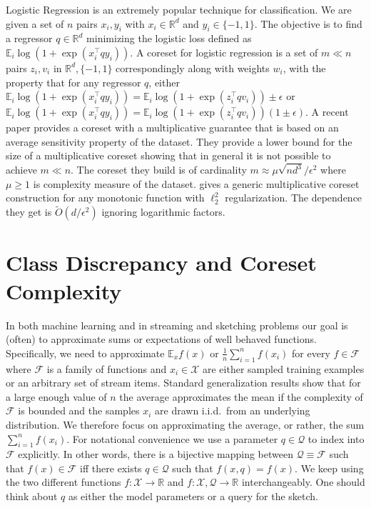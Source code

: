 \documentclass[anon,12pt]{colt2019} %
\newcommand{\R}{\mathbb{R}}
\newcommand{\E}{\mathbb{E}}
\newcommand{\eps}{\epsilon}
\newcommand{\F}{\mathcal{F}}
\newcommand{\X}{\mathcal{X}}
\newcommand{\Q}{\mathcal{Q}}
\begin{document}
Logistic Regression is an extremely popular technique for classification. We are given a set of $n$ pairs $x_i,y_i$ with $x_i \in \R^d$ and $y_i \in \{-1,1\}$. The objective is to find a regressor $q \in \R^d$ minimizing the logistic loss defined as $\E_i \log(1+\exp(x_i^\top q y_i))$. A coreset for logistic regression is a set of $m \ll n$ pairs $z_i, v_i$ in $\R^d, \{-1,1\}$ correspondingly along with weights $w_i$, with the property that for any regressor $q$, either $\E_i \log(1+\exp(x_i^\top q y_i)) = \E_i \log(1+\exp(z_i^\top q v_i)) \pm \eps$ or $\E_i \log(1+\exp(x_i^\top q y_i)) = \E_i \log(1+\exp(z_i^\top q v_i)) (1 \pm \eps)$. A recent paper \cite{DBLP:journals/corr/abs-1805-08571} provides a coreset with a multiplicative guarantee that is based on an average sensitivity property of the dataset. They provide a lower bound for the size of a multiplicative coreset showing that in general it is not possible to achieve $m \ll n$. The coreset they build is of cardinality $m \approx \mu\sqrt{nd^3}/\eps^2$ where $\mu \geq 1$ is complexity measure of the dataset.  \cite{tolochinsky2018coresets} gives a generic multiplicative coreset construction for any monotonic function with $\ell_2^2$ regularization. The dependence they get is $\tilde O(d/\eps^2)$ ignoring logarithmic factors.  


\section{Class Discrepancy and Coreset Complexity}

In both machine learning and in streaming and sketching problems our goal is (often) to approximate sums or expectations of well behaved functions.
Specifically, we need to approximate $\E_x f(x)$ or $\frac{1}{n}\sum_{i=1}^{n} f(x_i)$ for every $f\in \F$ where $\F$ is a family of functions and $x_i \in \X$ are either sampled training examples or an arbitrary set of stream items. 
Standard generalization results show that for a large enough value of $n$ the average approximates the mean if the complexity of $\F$ is bounded and the samples $x_i$ are drawn i.i.d.\ from an underlying distribution. We therefore focus on approximating the average, or rather, the sum $\sum_{i=1}^{n} f(x_i)$. For notational convenience we use a parameter $q \in \Q$ to index into $\F$ explicitly. 
In other words, there is a bijective mapping between $\Q \equiv \F$ such that $f(x) \in \F$ iff there exists $q\in\Q$ such that $f(x,q)=f(x)$.
We keep using the two different functions $f:\X\rightarrow\R$ and $f:\X,\Q\rightarrow\R$ interchangeably. 
One should think about $q$ as either the model parameters or a query for the sketch. 
\end{document}
